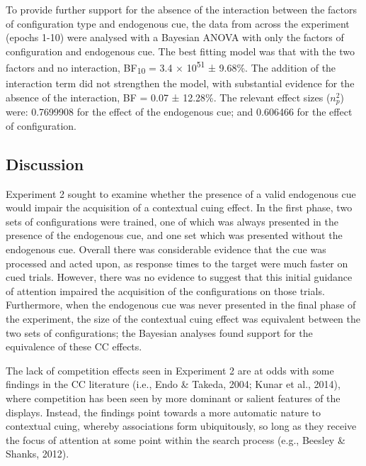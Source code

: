 \documentclass[
  man,
  floatsintext,
  longtable,
  nolmodern,
  notxfonts,
  notimes,
  colorlinks=true,linkcolor=blue,citecolor=blue,urlcolor=blue]{apa7}
\begin{document}
To provide further support for the absence of the interaction between
the factors of configuration type and endogenous cue, the data from
across the experiment (epochs 1-10) were analysed with a Bayesian ANOVA
with only the factors of configuration and endogenous cue. The best
fitting model was that with the two factors and no interaction,
BF\textsubscript{10} = 3.4 × 10\textsuperscript{51} ± 9.68\%. The
addition of the interaction term did not strengthen the model, with
substantial evidence for the absence of the interaction, BF = 0.07 ±
12.28\%. The relevant effect sizes (\(n^2_p\)) were: 0.7699908 for the
effect of the endogenous cue; and 0.606466 for the effect of
configuration.

\subsection{Discussion}\label{discussion-1}

Experiment 2 sought to examine whether the presence of a valid
endogenous cue would impair the acquisition of a contextual cuing
effect. In the first phase, two sets of configurations were trained, one
of which was always presented in the presence of the endogenous cue, and
one set which was presented without the endogenous cue. Overall there
was considerable evidence that the cue was processed and acted upon, as
response times to the target were much faster on cued trials. However,
there was no evidence to suggest that this initial guidance of attention
impaired the acquisition of the configurations on those trials.
Furthermore, when the endogenous cue was never presented in the final
phase of the experiment, the size of the contextual cuing effect was
equivalent between the two sets of configurations; the Bayesian analyses
found support for the equivalence of these CC effects.

The lack of competition effects seen in Experiment 2 are at odds with
some findings in the CC literature (i.e., Endo \& Takeda, 2004; Kunar et
al., 2014), where competition has been seen by more dominant or salient
features of the displays. Instead, the findings point towards a more
automatic nature to contextual cuing, whereby associations form
ubiquitously, so long as they receive the focus of attention at some
point within the search process (e.g., Beesley \& Shanks, 2012).
\end{document}
